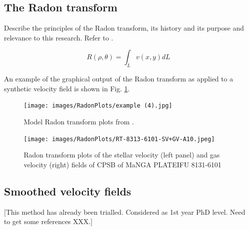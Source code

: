 \subsection{The Radon transform}
Describe the principles of the Radon transform, its history and its purpose and relevance to this research. Refer to \cite{2018MNRAS.480.2217S}.

\begin{equation}
    \label{eqn:radon}
    R(\rho,\theta)=\int_{L}{v(x,y) dL} 
\end{equation}

An example of the graphical output of the Radon transform as applied to a synthetic velocity field is shown in Fig. \ref{fig:Radon}.

\begin{figure}
    \centering
   	\texttt{[image: images/RadonPlots/example (4).jpg]}
    \caption{Model Radon transform plots from \citet{2018MNRAS.480.2217S}.}
    \label{fig:Radon}
\end{figure}




\begin{figure}
    \centering
   	\texttt{[image: images/RadonPlots/RT-8313-6101-SV+GV-A10.jpeg]}
    \caption{Radon transform plots of the stellar velocity (left panel) and gas velocity (right) fields of CPSB of MaNGA PLATEIFU 8131-6101}
    \label{fig:RT_8131-6101}
\end{figure}

\subsection{Smoothed velocity fields}
[This method has already been trialled. Considered as 1st year PhD level. Need to get some references XXX.]